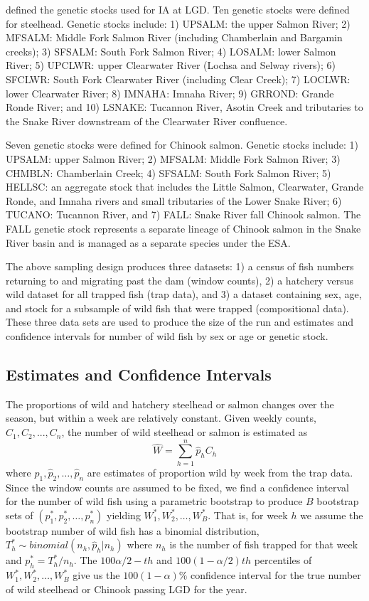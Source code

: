 \documentclass[%
                leqno,         %
%
]{nrc1}                          %
\begin{document}
\citet{Ackerman2014} defined the genetic stocks used for IA at LGD. Ten genetic stocks were defined for steelhead. Genetic stocks include: 1) UPSALM: the upper Salmon River; 2) MFSALM: Middle Fork Salmon River (including Chamberlain and Bargamin creeks); 3) SFSALM: South Fork Salmon River; 4) LOSALM: lower Salmon River; 5) UPCLWR: upper Clearwater River (Lochsa and Selway rivers); 6) SFCLWR: South Fork Clearwater River (including Clear Creek); 7) LOCLWR: lower Clearwater River; 8) IMNAHA: Imnaha River; 9) GRROND: Grande Ronde River; and 10) LSNAKE: Tucannon River, Asotin Creek and tributaries to the Snake River downstream of the Clearwater River confluence.

Seven genetic stocks were defined for Chinook salmon. Genetic stocks include: 1) UPSALM: upper Salmon River; 2) MFSALM: Middle Fork Salmon River; 3) CHMBLN: Chamberlain Creek; 4) SFSALM: South Fork Salmon River; 5) HELLSC: an aggregate stock that includes the Little Salmon, Clearwater, Grande Ronde, and Imnaha rivers and small tributaries of the Lower Snake River; 6) TUCANO: Tucannon River, and 7) FALL: Snake River fall Chinook salmon. The FALL genetic stock represents a separate lineage of Chinook salmon in the Snake River basin and is managed as a separate species under the ESA.

The above sampling design produces three datasets: 1) a census of fish numbers returning to and migrating past the dam (window counts), 2) a hatchery versus wild dataset for all trapped fish (trap data), and 3) a dataset containing sex, age, and stock for a subsample of wild fish that were trapped (compositional data). These three data sets are used to produce the size of the run and estimates and confidence intervals for number of wild fish by sex or age or genetic stock.

\subsection*{Estimates and Confidence Intervals}
The proportions of wild and hatchery steelhead or salmon changes over the season, but within a week are relatively constant. Given weekly counts, \(C_1,C_2,...,C_n\),   the number of wild steelhead or salmon is estimated as
\[\hat{W}=\sum\limits_{h=1}^{n} \hat{p}_hC_h\]	  
where \(\hat{p}_1, \hat{p}_2, \ldots, \hat{p}_n \) are estimates of proportion wild by week from the trap data.  Since the window counts are assumed to be fixed, we find a confidence interval for the number of wild fish using a parametric  bootstrap to produce $B$ bootstrap sets of \((p^*_1, p^*_2, \ldots, p^*_n)\) yielding \(W^*_1, W^*_2, \ldots, W^*_B\).   That is, for week $h$ we assume the bootstrap number of wild fish has a binomial distribution,  \(T^*_h\sim binomial(n_h,\hat{p}_h|n_h)\) where \(n_h\)  is the number of fish trapped for that  week and \(p^*_h = T^*_h/n_h\).  The \(100\alpha/2-th\) and \(100(1- \alpha/2)th\) percentiles of \(W^*_1, W^*_2, \ldots, W^*_B\) give us the \(100(1-\alpha)\%\) confidence interval for the true number of wild steelhead or Chinook passing LGD for the year.
\end{document}
